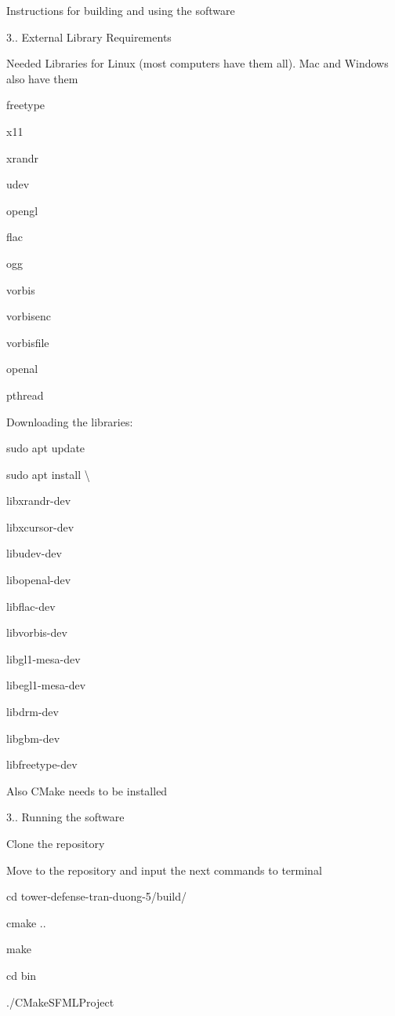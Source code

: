 Instructions for building and using the software

3.. External Library Requirements

Needed Libraries for Linux (most computers have them all). Mac and Windows also have them

freetype

x11

xrandr

udev

opengl

flac

ogg

vorbis

vorbisenc

vorbisfile

openal

pthread

Downloading the libraries\+:

sudo apt update

sudo apt install \textbackslash{} \begin{DoxyVerb}libxrandr-dev \ 

libxcursor-dev \ 

libudev-dev \ 

libopenal-dev \ 

libflac-dev \ 

libvorbis-dev \ 

libgl1-mesa-dev \ 

libegl1-mesa-dev \ 

libdrm-dev \ 

libgbm-dev \ 

libfreetype-dev 
\end{DoxyVerb}


Also CMake needs to be installed

3.. Running the software


\begin{DoxyEnumerate}
\item Clone the repository ~\newline

\item Move to the repository and input the next commands to terminal
\end{DoxyEnumerate}
\begin{DoxyItemize}
\item cd tower-\/defense-\/tran-\/duong-\/5/build/ ~\newline

\item cmake ..
\item make
\item cd bin
\item ./\+CMake\+SFMLProject ~\newline

\end{DoxyItemize}

